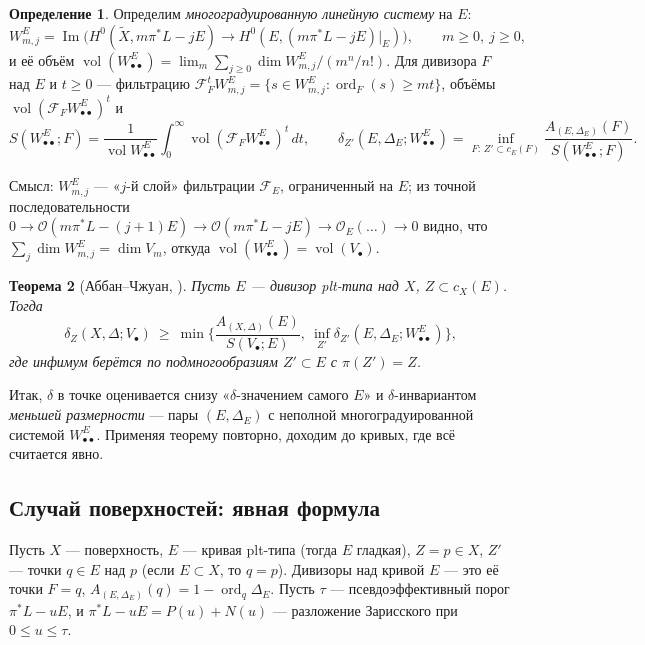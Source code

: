 \documentclass[11pt,a4paper]{article}
\theoremstyle{plain}
\newtheorem{theorem}{Теорема}[section]
\theoremstyle{definition}
\newtheorem{definition}[theorem]{Определение}
\theoremstyle{remark}
\newcommand{\cO}{\mathcal{O}}
\DeclareMathOperator{\ord}{ord}
\DeclareMathOperator{\im}{Im}
\DeclareMathOperator{\vol}{vol}
\begin{document}
\begin{definition}\label{def:refined-series}
Определим \emph{многоградуированную линейную систему} на $E$:
\[
W^E_{m,j}=\im\Big(H^0(\tilde X,m\pi^*L-jE)\to H^0(E,(m\pi^*L-jE)|_E)\Big),\qquad m\ge0,\ j\ge0,
\]
и её объём $\vol(W^E_{\bullet\bullet})=\lim_m\sum_{j\ge0}\dim W^E_{m,j}/(m^n/n!)$. Для дивизора $F$ над
$E$ и $t\ge0$ --- фильтрацию $\mathcal F_F^tW^E_{m,j}=\{s\in W^E_{m,j}:\ord_F(s)\ge mt\}$, объёмы
$\vol(\mathcal F_FW^E_{\bullet\bullet})^t$ и
\[
S(W^E_{\bullet\bullet};F)=\frac1{\vol W^E_{\bullet\bullet}}\int_0^\infty\vol(\mathcal F_FW^E_{\bullet\bullet})^t\,dt,\qquad
\delta_{Z'}(E,\Delta_E;W^E_{\bullet\bullet})=\inf_{F:\,Z'\subset c_E(F)}\frac{A_{(E,\Delta_E)}(F)}{S(W^E_{\bullet\bullet};F)} .
\]
\end{definition}

Смысл: $W^E_{m,j}$ --- «$j$-й слой» фильтрации $\mathcal F_E$, ограниченный на $E$; из точной
последовательности $0\to\cO(m\pi^*L-(j+1)E)\to\cO(m\pi^*L-jE)\to\cO_E(\dots)\to0$ видно, что
$\sum_j\dim W^E_{m,j}=\dim V_m$, откуда $\vol(W^E_{\bullet\bullet})=\vol(V_\bullet)$.

\begin{theorem}[{Аббан--Чжуан, \cite[3.2]{AZ}}]\label{thm:AZ}
Пусть $E$ --- дивизор plt-типа над $X$, $Z\subset c_X(E)$. Тогда
\[
\delta_Z(X,\Delta;V_\bullet)\ \ge\ \min\Big\{\frac{A_{(X,\Delta)}(E)}{S(V_\bullet;E)},\ \inf_{Z'}\delta_{Z'}(E,\Delta_E;W^E_{\bullet\bullet})\Big\},
\]
где инфимум берётся по подмногообразиям $Z'\subset E$ с $\pi(Z')=Z$.
\end{theorem}

Итак, $\delta$ в точке оценивается снизу «$\delta$-значением самого $E$» и $\delta$-инвариантом
\emph{меньшей размерности} --- пары $(E,\Delta_E)$ с неполной многоградуированной системой
$W^E_{\bullet\bullet}$. Применяя теорему повторно, доходим до кривых, где всё считается явно.

\subsection{Случай поверхностей: явная формула}

Пусть $X$ --- поверхность, $E$ --- кривая plt-типа (тогда $E$ гладкая), $Z=p\in X$, $Z'$ --- точки
$q\in E$ над $p$ (если $E\subset X$, то $q=p$). Дивизоры над кривой $E$ --- это её точки $F=q$,
$A_{(E,\Delta_E)}(q)=1-\ord_q\Delta_E$. Пусть $\tau$ --- псевдоэффективный порог
$\pi^*L-uE$, и $\pi^*L-uE=P(u)+N(u)$ --- разложение Зарисского при $0\le u\le\tau$.
\end{document}

